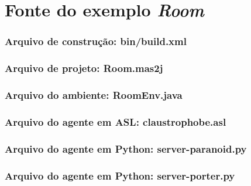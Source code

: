 \chapter{Fonte do exemplo \emph{Room}} \label{anexo-room}

\subsection*{Arquivo de construção: bin/build.xml}


\subsection*{Arquivo de projeto: Room.mas2j}


\subsection*{Arquivo do ambiente: RoomEnv.java}


\subsection*{Arquivo do agente em ASL: claustrophobe.asl}


%

\subsection*{Arquivo do agente em Python: server-paranoid.py}


\pagebreak
\subsection*{Arquivo do agente em Python: server-porter.py}


